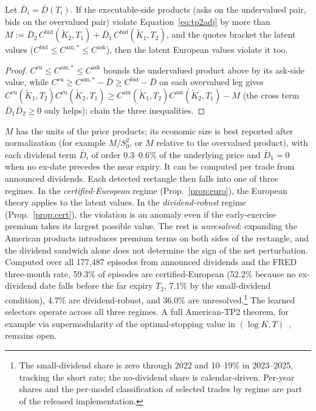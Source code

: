 \documentclass[sigconf,review]{acmart}
\begin{document}
\begin{proposition}\label{prop:cert}
Let $\bar D_i=\bar D(T_i)$. If the executable-side products (asks on the undervalued pair, bids on the overvalued pair) violate Equation~\eqref{eq:tp2adj} by more than $M:=\bar D_2\,C^{\mathrm{bid}}(\tilde K_2,T_1)+\bar D_1\,C^{\mathrm{bid}}(\tilde K_1,T_2)$, and the quotes bracket the latent values ($C^{\mathrm{bid}}\le C^{\mathrm{am},*}\le C^{\mathrm{ask}}$), then the latent European values violate it too.
\end{proposition}
\begin{proof}
$C^{\mathrm{eu}}\!\le\!C^{\mathrm{am},*}\!\le\!C^{\mathrm{ask}}$ bounds the undervalued product above by its ask-side value, while $C^{\mathrm{eu}}\!\ge\!C^{\mathrm{am},*}-\bar D\ge C^{\mathrm{bid}}-\bar D$ on each overvalued leg gives $C^{\mathrm{eu}}(\tilde K_1,T_2)C^{\mathrm{eu}}(\tilde K_2,T_1)\ge C^{\mathrm{am}}(\tilde K_1,T_2)C^{\mathrm{am}}(\tilde K_2,T_1)-M$ (the cross term $\bar D_1\bar D_2\ge0$ only helps); chain the three inequalities.
\end{proof}
\noindent $M$ has the units of the price products; its economic size is best reported after normalization (for example $M/S_0^2$, or $M$ relative to the overvalued product), with each dividend term $\bar D_i$ of order $0.3$--$0.6\%$ of the underlying price and $\bar D_1=0$ when no ex-date precedes the near expiry. It can be computed per trade from announced dividends. Each detected rectangle then falls into one of three regimes. In the \emph{certified-European} regime (Prop.~\ref{prop:euro}), the European theory applies to the latent values. In the \emph{dividend-robust} regime (Prop.~\ref{prop:cert}), the violation is an anomaly even if the early-exercise premium takes its largest possible value. The rest is \emph{unresolved}: expanding the American products introduces premium terms on both sides of the rectangle, and the dividend sandwich alone does not determine the sign of the net perturbation. Computed over all 177{,}487 episodes from announced dividends and the FRED three-month rate, 59.3\% of episodes are certified-European (52.2\% because no ex-dividend date falls before the far expiry $T_2$, 7.1\% by the small-dividend condition), 4.7\% are dividend-robust, and 36.0\% are unresolved.\footnote{The small-dividend share is zero through 2022 and 10--19\% in 2023--2025, tracking the short rate; the no-dividend share is calendar-driven. Per-year shares and the per-model classification of selected trades by regime are part of the released implementation.} The learned selectors operate across all three regimes. A full American-TP2 theorem, for example via supermodularity of the optimal-stopping value in $(\log K,T)$~\cite{topkis1998}, remains open.
\end{document}
